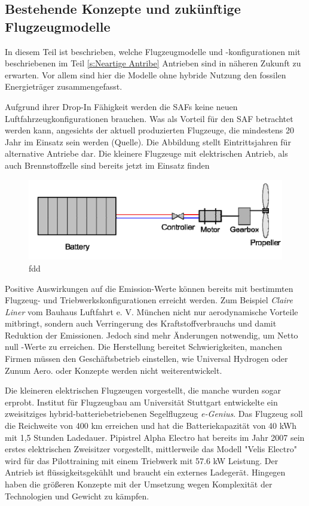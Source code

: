 \subsection{Bestehende Konzepte und zukünftige Flugzeugmodelle}
In diesem Teil ist beschrieben, welche Flugzeugmodelle und -konfigurationen mit beschriebenen im Teil \ref{s:Neartige Antribe} Antrieben
sind in näheren Zukunft zu erwarten. Vor allem sind hier die Modelle ohne hybride Nutzung den fossilen Energieträger zusammengefasst.

Aufgrund ihrer Drop-In Fähigkeit werden die SAFs keine neuen Luftfahrzeugkonfigurationen brauchen. Was als Vorteil für den SAF betrachtet werden kann,
angesichts der aktuell produzierten Flugzeuge, die mindestens 20 Jahr im Einsatz sein werden (Quelle).
Die Abbildung stellt Eintrittsjahren für alternative Antriebe dar.
Die kleinere Flugzeuge mit elektrischen Antrieb, als auch Brennstoffzelle sind bereits jetzt im Einsatz finden
%
\begin{figure}[h]
	\centering
	\includegraphics[width=0.9\linewidth]{Bilder/BA.png}
	\caption[Einfaches Modell eines Batterieantriebs]{fdd}
	\label{eis_antriebe}
\end{figure}
%
Positive Auswirkungen auf die Emission-Werte können bereits mit bestimmten Flugzeug- und Triebwerkskonfigurationen erreicht werden.
Zum Beispiel \textit{Claire Liner} vom Bauhaus Luftfahrt e. V. München nicht nur aerodynamische Vorteile mitbringt, 
sondern auch Verringerung des Kraftstoffverbrauchs und damit Reduktion der Emissionen.
Jedoch sind mehr Änderungen notwendig, um Netto null -Werte zu erreichen.
Die Herstellung bereitet Schwierigkeiten, manchen Firmen müssen den Geschäftsbetrieb einstellen, wie Universal Hydrogen oder Zunum Aero.
oder Konzepte werden nicht weiterentwickelt.

Die kleineren elektrischen Flugzeugen vorgestellt, die manche wurden sogar erprobt.
Institut für Flugzeugbau am Universität Stuttgart entwickelte ein zweisitziges hybrid-batteriebetriebenen Segelflugzeug \textit{e-Genius}. Das Flugzeug soll
die Reichweite von 400 km erreichen und hat die Batteriekapazität von 40 kWh mit 1,5 Stunden Ladedauer. %
Pipistrel Alpha Electro hat bereits im Jahr 2007 sein erstes elektrischen Zweisitzer vorgestellt, mittlerweile das Modell "Velis Electro" \cite{Pipistrel_VelisElectro} wird
für das Pilottraining mit einem Triebwerk mit 57.6 kW Leistung. Der Antrieb ist flüssigkeitsgekühlt und braucht ein externes Ladegerät.
Hingegen haben die größeren Konzepte mit der Umsetzung wegen Komplexität der Technologien und Gewicht zu kämpfen.\\


